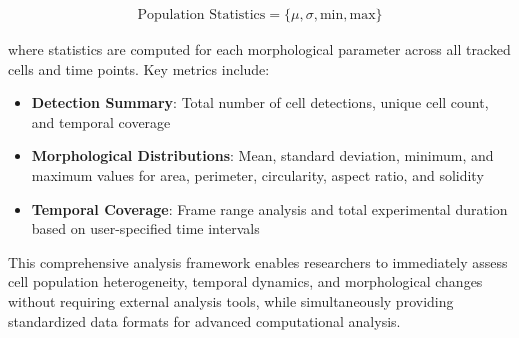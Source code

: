 \documentclass[../cellseek_paper.tex]{subfiles}
\begin{document}
\begin{align}
  \text{Population Statistics} = \{\mu, \sigma, \text{min}, \text{max}\}
\end{align}

where statistics are computed for each morphological parameter across all tracked cells and time points. Key metrics include:

\begin{itemize}
  \item \textbf{Detection Summary}: Total number of cell detections, unique cell count, and temporal coverage
  \item \textbf{Morphological Distributions}: Mean, standard deviation, minimum, and maximum values for area, perimeter, circularity, aspect ratio, and solidity
  \item \textbf{Temporal Coverage}: Frame range analysis and total experimental duration based on user-specified time intervals
\end{itemize}

This comprehensive analysis framework enables researchers to immediately assess cell population heterogeneity, temporal dynamics, and morphological changes without requiring external analysis tools, while simultaneously providing standardized data formats for advanced computational analysis.
\end{document}
